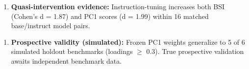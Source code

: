 \begin{enumerate}
\item \textbf{Quasi-intervention evidence:} Instruction-tuning increases both BSI (Cohen's d = 1.87) and PC1 scores (d = 1.99) within 16 matched base/instruct model pairs.
\end{enumerate}

\begin{enumerate}
\item \textbf{Prospective validity (simulated):} Frozen PC1 weights generalize to 5 of 6 simulated holdout benchmarks (loadings $\geq$ 0.3). True prospective validation awaits independent benchmark data.
\end{enumerate}
